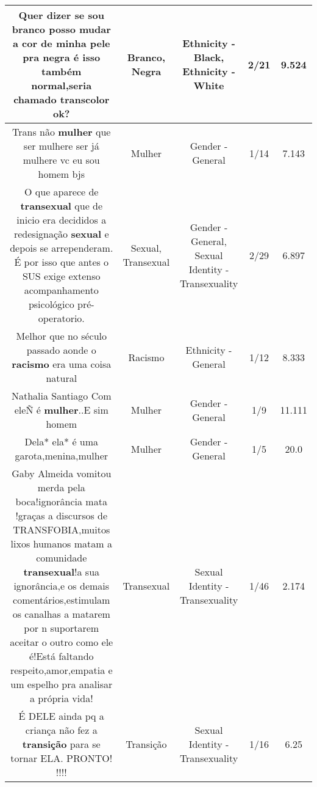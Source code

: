 \documentclass[11pt]{article}
\newlength\mylength
\begin{document}
\begin{center}
\begin{longtable}{|C{.65\mylength}|C{.30\mylength}|C{.12\mylength}|C{.12\mylength}|C{.12\mylength}|}
  \small Quer dizer se sou \textbf{branco} posso mudar a cor de minha pele pra \textbf{negra} é isso também normal,seria chamado transcolor ok?\normalsize   & Branco, Negra & Ethnicity - Black, Ethnicity - White & 2/21 & 9.524 \\  \hline
  \small Trans não \textbf{mulher} que ser mulhere ser já mulhere vc eu sou homem bjs\normalsize   & Mulher & Gender - General & 1/14 & 7.143 \\  \hline
  \small O que aparece de \textbf{transexual} que de inicio era decididos a  redesignação \textbf{sexual} e depois se arrependeram. É por isso que antes o SUS exige extenso acompanhamento psicológico pré-operatorio.\normalsize   & Sexual, Transexual & Gender - General, Sexual Identity - Transexuality & 2/29 & 6.897 \\  \hline
  \small Melhor que no século passado aonde o \textbf{racismo} era uma coisa natural\normalsize   & Racismo & Ethnicity - General & 1/12 & 8.333 \\  \hline
  \small Nathalia Santiago Com eleÑ é \textbf{mulher}..E sim homem\normalsize   & Mulher & Gender - General & 1/9 & 11.111 \\  \hline
  \small Dela* ela* é uma garota,menina,mulher\normalsize   & Mulher & Gender - General & 1/5 & 20.0 \\  \hline
  \small Gaby Almeida vomitou merda pela boca!ignorância mata !graças a discursos de TRANSFOBIA,muitos lixos humanos matam a comunidade \textbf{transexual}!a sua ignorância,e os demais comentários,estimulam os canalhas a matarem por n suportarem aceitar o outro como ele é!Está faltando respeito,amor,empatia e um espelho pra analisar a própria vida!\normalsize   & Transexual & Sexual Identity - Transexuality & 1/46 & 2.174 \\  \hline
  \small É DELE ainda pq a criança não fez a \textbf{transição} para se tornar ELA. PRONTO! !!!!\normalsize   & Transição & Sexual Identity - Transexuality & 1/16 & 6.25 \\  \hline

\end{longtable}
\end{center}
\end{document}

